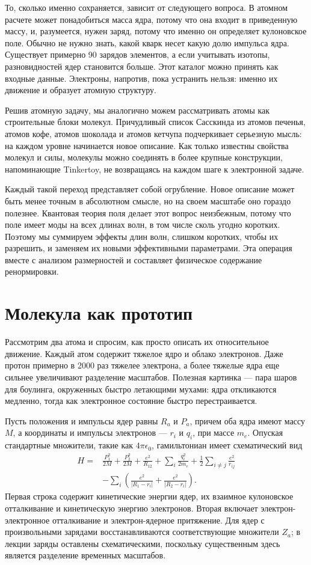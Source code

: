 То, сколько именно сохраняется, зависит от следующего вопроса. В атомном расчете может понадобиться масса ядра, потому что она входит в приведенную массу, и, разумеется, нужен заряд, потому что именно он определяет кулоновское поле. Обычно не нужно знать, какой кварк несет какую долю импульса ядра. Существует примерно 90 зарядов элементов, а если учитывать изотопы, разновидностей ядер становится больше. Этот каталог можно принять как входные данные. Электроны, напротив, пока устранить нельзя: именно их движение и образует атомную структуру.

Решив атомную задачу, мы аналогично можем рассматривать атомы как строительные блоки молекул. Причудливый список Сасскинда из атомов печенья, атомов кофе, атомов шоколада и атомов кетчупа подчеркивает серьезную мысль: на каждом уровне начинается новое описание. Как только известны свойства молекул и силы, молекулы можно соединять в более крупные конструкции, напоминающие Tinkertoy, не возвращаясь на каждом шаге к электронной задаче.

Каждый такой переход представляет собой огрубление. Новое описание может быть менее точным в абсолютном смысле, но на своем масштабе оно гораздо полезнее. Квантовая теория поля делает этот вопрос неизбежным, потому что поле имеет моды на всех длинах волн, в том числе сколь угодно коротких. Поэтому мы суммируем эффекты длин волн, слишком коротких, чтобы их разрешить, и заменяем их новыми эффективными параметрами. Эта операция вместе с анализом размерностей и составляет физическое содержание ренормировки.

\section{Молекула как прототип}

Рассмотрим два атома и спросим, как просто описать их относительное движение. Каждый атом содержит тяжелое ядро и облако электронов. Даже протон примерно в 2000 раз тяжелее электрона, а более тяжелые ядра еще сильнее увеличивают разделение масштабов. Полезная картинка — пара шаров для боулинга, окруженных быстро летающими мухами: ядра откликаются медленно, тогда как электронное состояние быстро перестраивается.

Пусть положения и импульсы ядер равны \(R_a\) и \(P_a\), причем оба ядра имеют массу \(M\), а координаты и импульсы электронов — \(r_i\) и \(q_i\), при массе \(m_e\). Опуская стандартные множители, такие как \(4\pi\epsilon_0\), гамильтониан имеет схематический вид
\begin{align}
H={}&
\frac{P_1^2}{2M}+\frac{P_2^2}{2M}
+\frac{e^2}{R_{12}}
+\sum_i\frac{q_i^2}{2m_e}
+\frac12\sum_{i\ne j}\frac{e^2}{r_{ij}}
\nonumber\\
&-\sum_i\left(
\frac{e^2}{|R_1-r_i|}
+\frac{e^2}{|R_2-r_i|}
\right).
\label{eq:molecular-hamiltonian}
\end{align}
Первая строка содержит кинетические энергии ядер, их взаимное кулоновское отталкивание и кинетическую энергию электронов. Вторая включает электрон-электронное отталкивание и электрон-ядерное притяжение. Для ядер с произвольными зарядами восстанавливаются соответствующие множители \(Z_a\); в лекции заряды оставлены схематическими, поскольку существенным здесь является разделение временных масштабов.

